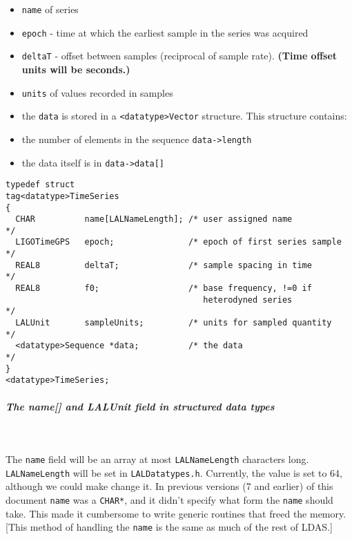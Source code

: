 \documentclass[]{ligodcc}
\renewcommand{\texttt}[1]{{\ttfamily\color{blue}#1}}
\begin{document}
\begin{itemize}
\vspace{-0.15in}
\item
{\tt name} of series
\vspace{-0.15in}
\item
{\tt epoch} - time at which the earliest sample in the series was acquired
\vspace{-0.15in}
\item
{\tt deltaT} -  offset between samples (reciprocal of sample rate).
{\bf (Time offset units will be seconds.)}
\vspace{-0.15in}
\item
{\tt units} of values recorded in samples
\vspace{-0.15in}
\item
the {\tt data} is stored in a  {\tt <datatype>Vector}  structure. This structure contains:
\vspace{-0.15in}
\item
the number of elements in the sequence {\tt data->length}
\vspace{-0.15in}
\item
the data itself is in {\tt data->data[]}
\end{itemize}

{\footnotesize
\begin{verbatim}
typedef struct
tag<datatype>TimeSeries
{
  CHAR          name[LALNameLength]; /* user assigned name           */
  LIGOTimeGPS   epoch;               /* epoch of first series sample */
  REAL8         deltaT;              /* sample spacing in time       */
  REAL8         f0;                  /* base frequency, !=0 if
                                        heterodyned series           */
  LALUnit       sampleUnits;         /* units for sampled quantity   */
  <datatype>Sequence *data;          /* the data                     */
}
<datatype>TimeSeries;
\end{verbatim}}


\subparagraph[LALUnit data type]{The {\texttt {name[]}}
and {\texttt {LALUnit}} field in structured data types }~
\label{name}

\noindent
The {\tt name} field will be an array at most {\tt LALNameLength} characters long.
{\tt LALNameLength} will be set in {\tt LALDatatypes.h}.  Currently, the value is
set to 64, although we could make change it.  In previous versions (7
and earlier) of this document {\tt name} was a {\tt CHAR*}, and it didn't specify
what form the {\tt name} should take.  This made it cumbersome  to write
generic routines that freed the memory.  [This method of handling the
{\tt name} is the same as much of the rest of LDAS.]
\end{document}
